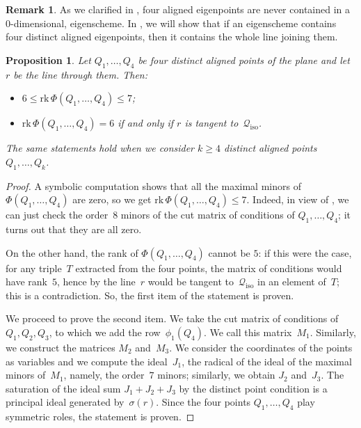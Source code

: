\documentclass[a4paper, 11pt, reqno]{amsart}
\theoremstyle{plain}
\newtheorem{prop}[lemma]{Proposition}
\theoremstyle{definition}
\newtheorem{rmk}[lemma]{Remark}
\newcommand{\rk}{\ensuremath{\mathrm{rk}}}
\newcommand{\iso}{\mathcal{Q}_{\mathrm{iso}}}
\begin{document}
\begin{rmk}
As we clarified in , four aligned eigenpoints are never contained in a $0$-dimensional, eigenscheme.
In , we will show that if an eigenscheme contains four distinct aligned eigenpoints, then it contains the whole line joining them.
\end{rmk}

\begin{prop}
\label{proposition:four_aligned}
Let $Q_1, \dotsc, Q_4$ be four distinct aligned points of the plane and
let $r$ be the line through them. Then:
%
\begin{itemize}
  \item $6 \leq \rk \,\Phi(Q_1, \dotsc, Q_4) \leq 7$;
  \item $\rk \,\Phi(Q_1, \dotsc, Q_4) = 6$ if and only if $r$ is tangent to~$\iso$.
\end{itemize}
%
The same statements hold when we consider $k \geq 4$ distinct aligned points $Q_1, \dotsc, Q_k$.
\end{prop}
\begin{proof}
A symbolic computation shows that all the maximal minors of~$\Phi(Q_1, \dotsc, Q_4)$ are zero, so we get 
$\rk \, \Phi(Q_1, \dotsc, Q_4) \leq 7$.
Indeed, in view of , we can just check the order~$8$ minors of the cut matrix of conditions of $Q_1, \dotsc, Q_4$;
it turns out that they are all zero.

On the other hand, the rank of $\Phi(Q_1, \dotsc, Q_4)$ cannot be $5$:
if this were the case, for any triple~$T$ extracted from the four points, the matrix of conditions would have rank~$5$, hence by  the line~$r$ would be tangent to~$\iso$ in an element of~$T$; this is a contradiction.
So, the first item of the statement is proven.

We proceed to prove the second item.
We take the cut matrix of conditions of~$Q_1, Q_2, Q_3$, to which we add the row~$\phi_1(Q_4)$.
We call this matrix~$M_1$.
Similarly, we construct the matrices $M_2$ and~$M_3$.
We consider the coordinates of the points as variables and we compute the ideal~$J_1$,
the radical of the ideal of the maximal minors of~$M_1$, namely, the order~$7$ minors;
similarly, we obtain $J_2$ and~$J_3$.
The saturation of the ideal sum $J_1 + J_2 + J_3$ by the distinct point condition is a principal ideal generated by~$\sigma(r)$.
Since the four points $Q_1, \dotsc, Q_4$ play symmetric roles, the statement is proven.
\end{proof}
\end{document}
